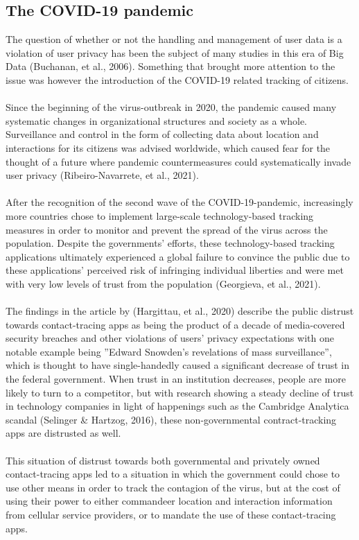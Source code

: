 \documentclass[11pt]{article}
\begin{document}
\subsection{The COVID-19 pandemic}
The question of whether or not the handling and management of user data is a violation of user privacy has been the subject of many studies in this era of Big Data (Buchanan, et al., 2006). Something that brought more attention to the issue was however the introduction of the COVID-19 related tracking of citizens.
\\ \\
Since the beginning of the virus-outbreak in 2020, the pandemic caused many systematic changes in organizational structures and society as a whole. Surveillance and control in the form of collecting data about location and interactions for its citizens was advised worldwide, which caused fear for the thought of a future where pandemic countermeasures could systematically invade user privacy (Ribeiro-Navarrete, et al., 2021). 
\\ \\
After the recognition of the second wave of the COVID-19-pandemic, increasingly more countries chose to implement large-scale technology-based tracking measures in order to monitor and prevent the spread of the virus across the population. Despite the governments’ efforts, these technology-based tracking applications ultimately experienced a global failure to convince the public due to these applications’ perceived risk of infringing individual liberties and were met with very low levels of trust from the population (Georgieva, et al., 2021). 
\\ \\
The findings in the article by (Hargittau, et al., 2020) describe the public distrust towards contact-tracing apps as being the product of a decade of media-covered security breaches and other violations of users’ privacy expectations with one notable example being ”Edward Snowden’s revelations of mass surveillance”, which is thought to have single-handedly caused a significant decrease of trust in the federal government. When trust in an institution decreases, people are more likely to turn to a competitor, but with research showing a steady decline of trust in technology companies in light of happenings such as the Cambridge Analytica scandal (Selinger \& Hartzog, 2016), these non-governmental contract-tracking apps are distrusted as well.
\\ \\
This situation of distrust towards both governmental and privately owned contact-tracing apps led to a situation in which the government could chose to use other means in order to track the contagion of the virus, but at the cost of using their power to either commandeer location and interaction information from cellular service providers, or to mandate the use of these contact-tracing apps.
\end{document}
